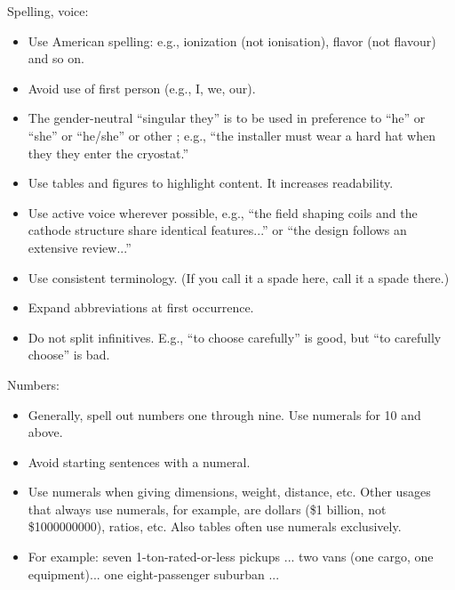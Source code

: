 Spelling, voice:
\begin{itemize}
\item Use American spelling: e.g., ionization (not ionisation), flavor (not flavour) and so on.
\item Avoid use of first person (e.g., I, we, our). 
\item The gender-neutral ``singular they'' is to be used in preference to ``he'' or ``she'' or ``he/she'' or other ; e.g., ``the installer must wear a hard hat when they they enter the cryostat.''
\item Use tables and figures to highlight content. It increases readability.
\item Use active voice wherever possible, e.g., ``the field shaping coils and the cathode structure share identical features...'' or ``the design follows  an extensive review...''
\item Use consistent terminology. (If you call it a spade here, call it a spade there.)
\item Expand abbreviations at first occurrence.
\item Do not split infinitives. E.g., ``to choose carefully'' is good, but ``to carefully choose'' is bad.
\end{itemize}

Numbers:
\begin{itemize}
\item Generally, spell out numbers one through nine. Use numerals for \num{10} and above.
\item Avoid starting sentences with a numeral.
\item Use numerals when giving dimensions, weight, distance, etc. Other usages that always use numerals, for example, are dollars (\$1 billion, not \$\num{1000000000}), ratios, etc. Also tables often use numerals exclusively.
\item For example: seven 1-ton-rated-or-less pickups ... two vans (one cargo, one equipment)... one eight-passenger suburban ...
\end{itemize}

